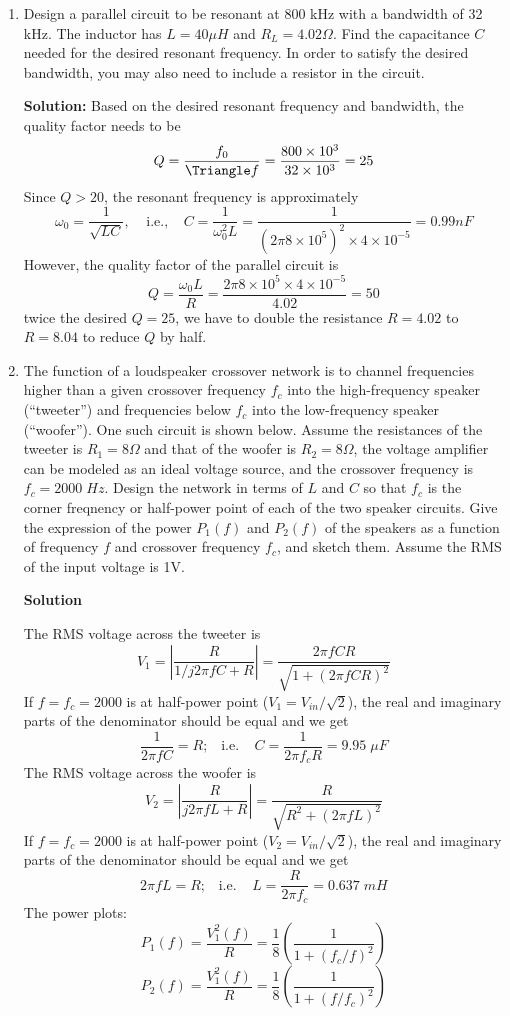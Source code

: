 \begin{enumerate}
\item Design a parallel circuit to be resonant at 800 kHz with a bandwidth
of 32 kHz. The inductor has $L=40 \mu H$ and $R_L=4.02 \Omega$. Find the
capacitance $C$ needed for the desired resonant frequency. In order to 
satisfy the desired bandwidth, you may also need to include a resistor in 
the circuit. 

  {\bf Solution:} Based on the desired resonant frequency and bandwidth, 
  the quality factor needs to be
  \[ Q=\frac{f_0}{\Triangle f}=\frac{800\times 10^3}{32 \times 10^3}=25 \]
  Since $Q>20$, the resonant frequency is approximately
  \[ \omega_0=\frac{1}{\sqrt{LC}},\;\;\;\;\mbox{i.e.,}\;\;\;\;
  C=\frac{1}{\omega_0^2 L}=\frac{1}{(2\pi 8\times 10^5)^2\times 4\times 10^{-5}}
  =0.99 nF \]
  However, the quality factor of the parallel circuit is
  \[ Q=\frac{\omega_0 L}{R}=\frac{2\pi 8 \times 10^5 \times 4\times 10^{-5}}
 	{4.02}=50 \]
  twice the desired $Q=25$, we have to double the resistance $R=4.02$ to 
  $R=8.04$ to reduce $Q$ by half.

\item The function of a loudspeaker crossover network is to channel 
frequencies higher than a given crossover frequency $f_c$ into the
high-frequency speaker (``tweeter'') and frequencies below $f_c$ into
the low-frequency speaker (``woofer''). One such circuit is shown below.
Assume the resistances of the tweeter is $R_1=8\Omega$ and that of the 
woofer is $R_2=8\Omega$, the voltage amplifier can be modeled as an
ideal voltage source, and the crossover frequency is $f_c=2000\; Hz$.
Design the network in terms of $L$ and $C$ so that $f_c$ is the corner
freqnency or half-power point of each of the two speaker circuits. Give 
the expression of the power $P_1(f)$ and $P_2(f)$ of the speakers as a 
function of frequency $f$ and crossover frequency $f_c$, and sketch them.
Assume the RMS of the input voltage is 1V.


   {\bf Solution}
   
   The RMS voltage across the tweeter is
   \[	V_1=|\frac{R}{1/j2\pi f C+R}|
   	=\frac{2\pi f CR}{\sqrt{1+(2\pi f CR)^2}}	\]
   If $f=f_c=2000$ is at half-power point ($V_1=V_{in}/\sqrt{2}$), the real and
   imaginary parts of the denominator should be equal and we get 
   \[	\frac{1}{2\pi f C}=R;\;\;\;\mbox{i.e.}\;\;\;\;
   	C=\frac{1}{2\pi f_c R}=9.95 \;\mu F	\]
  The RMS voltage across the woofer is
  \[	V_2=|\frac{R}{j2\pi f L+R}|
   	=\frac{R}{\sqrt{R^2+(2\pi f L)^2}}	\]
   If $f=f_c=2000$ is at half-power point ($V_2=V_{in}/\sqrt{2}$), the real and
   imaginary parts of the denominator should be equal and we get 
   \[	2\pi f L=R;\;\;\;\mbox{i.e.}\;\;\;\;
   	L=\frac{R}{2\pi f_c}=0.637 \;mH	\]
   The power plots:
   \[	P_1(f)=\frac{V_1^2(f)}{R}=\frac{1}{8}(\frac{1}{1+(f_c/f)^2}) \]
   \[	P_2(f)=\frac{V_1^2(f)}{R}=\frac{1}{8}(\frac{1}{1+(f/f_c)^2}) \]

\end{enumerate}


